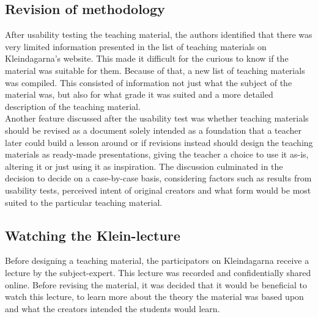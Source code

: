 \subsection{Revision of methodology}
After usability testing the teaching material, the authors identified that there was very limited information presented in the list of teaching materials on Kleindagarna's website. This made it difficult for the curious to know if the material was suitable for them. Because of that, a new list of teaching materials was compiled. This consisted of information not just what the subject of the material was, but also for what grade it was suited and a more detailed description of the teaching material.\\
Another feature discussed after the usability test was whether teaching materials should be revised as a document solely intended as a foundation that a teacher later could build a lesson around or if revisions instead should design the teaching materials as ready-made presentations, giving the teacher a choice to use it as-is, altering it or just using it as inspiration. The discussion culminated in the decision to decide on a case-by-case basis, considering factors such as results from usability tests, perceived intent of original creators and what form would be most suited to the particular teaching material.
\subsection{Watching the Klein-lecture}
Before designing a teaching material, the participators on Kleindagarna receive a lecture by the subject-expert. This lecture was recorded and confidentially shared online. Before revising the material, it was decided that it would be beneficial to watch this lecture, to learn more about the theory the material was based upon and what the creators intended the students would learn.
